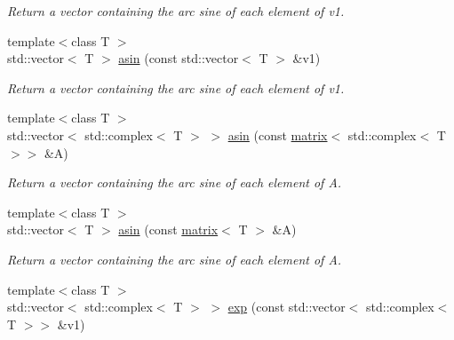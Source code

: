 \begin{DoxyCompactItemize}
\begin{DoxyCompactList}\small\item\em Return a vector containing the arc sine of each element of v1. \end{DoxyCompactList}\item 
\hypertarget{namespacekeycpp_aba2b31e627ef6a9d04239fa435d81e9e}{{\footnotesize template$<$class T $>$ }\\std\-::vector$<$ T $>$ \hyperlink{namespacekeycpp_aba2b31e627ef6a9d04239fa435d81e9e}{asin} (const std\-::vector$<$ T $>$ \&v1)}\label{namespacekeycpp_aba2b31e627ef6a9d04239fa435d81e9e}

\begin{DoxyCompactList}\small\item\em Return a vector containing the arc sine of each element of v1. \end{DoxyCompactList}\item 
\hypertarget{namespacekeycpp_ad1781a15fc7aa5de38db6e4eb92c9e22}{{\footnotesize template$<$class T $>$ }\\std\-::vector$<$ std\-::complex$<$ T $>$ $>$ \hyperlink{namespacekeycpp_ad1781a15fc7aa5de38db6e4eb92c9e22}{asin} (const \hyperlink{classkeycpp_1_1matrix}{matrix}$<$ std\-::complex$<$ T $>$$>$ \&A)}\label{namespacekeycpp_ad1781a15fc7aa5de38db6e4eb92c9e22}

\begin{DoxyCompactList}\small\item\em Return a vector containing the arc sine of each element of A. \end{DoxyCompactList}\item 
\hypertarget{namespacekeycpp_a8bb201db3ca1ccd6eca8fd7395f17539}{{\footnotesize template$<$class T $>$ }\\std\-::vector$<$ T $>$ \hyperlink{namespacekeycpp_a8bb201db3ca1ccd6eca8fd7395f17539}{asin} (const \hyperlink{classkeycpp_1_1matrix}{matrix}$<$ T $>$ \&A)}\label{namespacekeycpp_a8bb201db3ca1ccd6eca8fd7395f17539}

\begin{DoxyCompactList}\small\item\em Return a vector containing the arc sine of each element of A. \end{DoxyCompactList}\item 
\hypertarget{namespacekeycpp_a50caa1bee883d40591442882e777a67b}{{\footnotesize template$<$class T $>$ }\\std\-::vector$<$ std\-::complex$<$ T $>$ $>$ \hyperlink{namespacekeycpp_a50caa1bee883d40591442882e777a67b}{exp} (const std\-::vector$<$ std\-::complex$<$ T $>$$>$ \&v1)}\label{namespacekeycpp_a50caa1bee883d40591442882e777a67b}


\end{DoxyCompactItemize}
